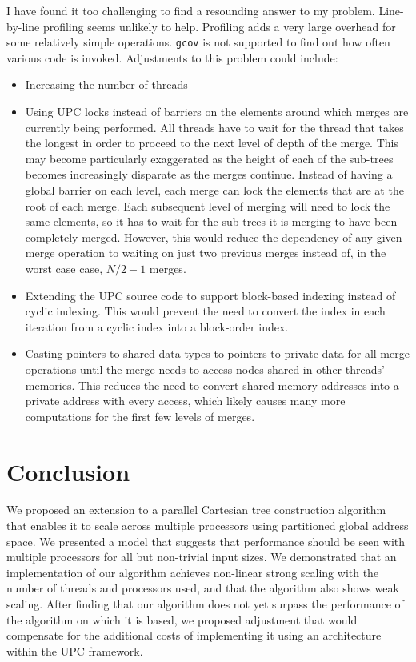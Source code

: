 \documentclass[10pt]{article}
\begin{document}
I have found it too challenging to find a resounding answer to my problem.
Line-by-line profiling seems unlikely to help.
Profiling adds a very large overhead for some relatively simple operations.
\texttt{gcov} is not supported to find out how often various code is invoked.
Adjustments to this problem could include:
\begin{itemize}
  \item Increasing the number of threads
  \item Using UPC locks instead of barriers on the elements around which merges are currently being 
        performed.
        All threads have to wait for the thread that takes the longest in order to proceed to the
        next level of depth of the merge.
        This may become particularly exaggerated as the height of each of the sub-trees becomes
        increasingly disparate as the merges continue.
        Instead of having a global barrier on each level, each merge can lock the elements that
        are at the root of each merge.
        Each subsequent level of merging will need to lock the same elements, so it has to wait
        for the sub-trees it is merging to have been completely merged.
        However, this would reduce the dependency of any given merge operation to waiting on just
        two previous merges instead of, in the worst case case, $N / 2 - 1$ merges.
  \item Extending the UPC source code to support block-based indexing instead of cyclic indexing.
        This would prevent the need to convert the index in each iteration from a cyclic index
        into a block-order index.
  \item Casting pointers to shared data types to pointers to private data for all merge operations
        until the merge needs to access nodes shared in other threads' memories.
        This reduces the need to convert shared memory addresses into a private address with every
        access, which likely causes many more computations for the first few levels of merges.
\end{itemize}

\section{Conclusion}

We proposed an extension to a parallel Cartesian tree construction algorithm that enables it to
scale across multiple processors using partitioned global address space.
We presented a model that suggests that performance should be seen with multiple processors 
for all but non-trivial input sizes.
We demonstrated that an implementation of our algorithm achieves non-linear strong scaling with
the number of threads and processors used, and that the algorithm also shows weak scaling.
After finding that our algorithm does not yet surpass the performance of the algorithm on which
it is based, we proposed adjustment that would compensate for the additional costs of implementing
it using an architecture within the UPC framework.
\end{document}
